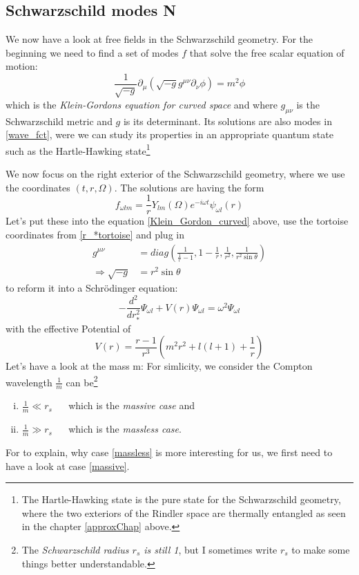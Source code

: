 \subsection{Schwarzschild modes \textbf{N}}
	We now have a look at free fields in the Schwarzschild geometry. For the beginning we need to find a set of modes $f$ that solve the free scalar equation of motion:
		\begin{equation} \label{Klein_Gordon_curved}
			\frac{1}{\sqrt{-g}} \partial_\mu (\sqrt{-g} g^{\mu \nu} \partial_\nu \phi)
			= m^2 \phi
		\end{equation}
	which is the \textit{Klein-Gordons equation for curved space} and where $g_{\mu \nu}$ is the Schwarzschild metric and $g$ is its determinant. Its solutions are also modes in \eqref{wave_fct}, were we can study its properties in an appropriate quantum state such as the Hartle-Hawking state\footnote{The Hartle-Hawking state is the pure state for the Schwarzschild geometry, where the two exteriors of the Rindler space are thermally entangled as seen in the chapter \ref{approxChap} above.}
	
	We now focus on the right exterior of the Schwarzschild geometry, where we use the coordinates $(t,r, \Omega)$. The solutions are having the form
		\begin{equation}
			f_{\omega l m} = 
			\frac{1}{r} Y_{l m}(\Omega) e^{-i \omega t} \psi_{\omega l}(r)
		\end{equation}
	Let's put these into the equation \eqref{Klein_Gordon_curved} above, use the tortoise coordinates from \eqref{r_*tortoise} and plug in
		\begin{align*}
			g^{\mu \nu} &= diag \left(
				\frac{1}{\frac{1}{r}-1},
				1 - \frac{1}{r},
				\frac{1}{r^2},
				\frac{1}{r^2 \sin \theta}
			\right) \\
			\Rightarrow \sqrt{-g}&= r^2 \sin \theta
		\end{align*}
	to reform it into a Schrödinger equation:
		\begin{equation} \label{schroedinger_eq}
			- \frac{d^2}{dr^2_*} \Psi_{\omega l} 
			+ V(r) \Psi_{\omega l} 
			= \omega^2 \Psi_{\omega l}
		\end{equation}
	with the effective Potential of
		\begin{equation}
			V(r)=
			\frac{r-1}{r^3} \left( m^2r^2 + l(l+1) + \frac{1}{r}
			\right)
		\end{equation}
	Let's have a look at the mass m: For simlicity, we consider the Compton wavelength $\frac{1}{m}$ can be\footnote{ The \textit{Schwarzschild radius $r_s$ is still 1}, but I sometimes write $r_s$ to make some things better understandable.} 
		\begin{enumerate}[(i)]
			\item $\frac{1}{m} \ll r_s$	~~ which is the \textit{massive case} and \label{massive}
			\item $\frac{1}{m} \gg r_s$	~~ which is the \textit{massless case}. \label{massless}
		\end{enumerate}
	For to explain, why case \eqref{massless} is more interesting for us, we first need to have a look at case \eqref{massive}.
	
